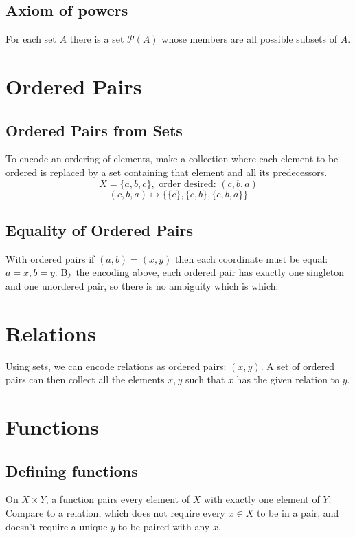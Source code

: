 \documentclass{article}
\begin{document}
\subsection{Axiom of powers} For each set $A$ there is a set $\mathcal{P}(A)$ whose members are all possible subsets of $A$. 

\section{Ordered Pairs}

\subsection{Ordered Pairs from Sets} To encode an ordering of elements, make a collection where each element to be ordered is replaced by a set containing that element and all its predecessors.
$$X = \{a, b, c\}, \text{ order desired: } (c, b, a)$$
$$(c, b, a) \longmapsto \{\{c\}, \{c, b\}, \{c, b, a\}\}$$

\subsection{Equality of Ordered Pairs} With ordered pairs if $(a, b) = (x, y)$ then each coordinate must be equal: $a = x, b = y$. By the encoding above, each ordered pair has exactly one singleton and one unordered pair, so there is no ambiguity which is which.

\section{Relations}

Using sets, we can encode relations as ordered pairs: $(x, y)$. A set of ordered pairs can then collect all the elements $x, y$ such that $x$ has the given relation to $y$.

\section{Functions}

\subsection{Defining functions} 

On $X \times Y$, a function pairs every element of $X$ with exactly one element of $Y$. Compare to a relation, which does not require every $x \in X$ to be in a pair, and doesn't require a unique $y$ to be paired with any $x$.
\end{document}
